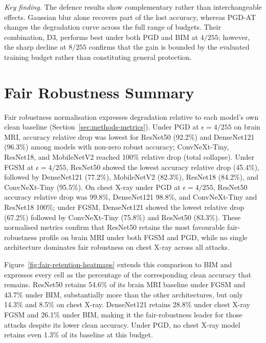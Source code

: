 \documentclass[12pt,a4paper,oneside]{report}
\begin{document}
\noindent\textit{Key finding.} The defence results show complementary rather than interchangeable effects. Gaussian blur alone recovers part of the lost accuracy, whereas PGD-AT changes the degradation curve across the full range of budgets. Their combination, D3, performs best under both PGD and BIM at $4/255$; however, the sharp decline at $8/255$ confirms that the gain is bounded by the evaluated training budget rather than constituting general protection.

\section{Fair Robustness Summary}
\label{sec:results-fair}


Fair robustness normalisation expresses degradation relative to each model's own clean baseline (Section~\ref{sec:methods-metrics}). Under PGD at $\epsilon = 4/255$ on brain MRI, accuracy relative drop was lowest for ResNet50 (92.2\%) and DenseNet121 (96.3\%) among models with non-zero robust accuracy; ConvNeXt-Tiny, ResNet18, and MobileNetV2 reached 100\% relative drop (total collapse). Under FGSM at $\epsilon = 4/255$, ResNet50 showed the lowest accuracy relative drop (45.4\%), followed by DenseNet121 (77.2\%), MobileNetV2 (82.3\%), ResNet18 (84.2\%), and ConvNeXt-Tiny (95.5\%). On chest X-ray under PGD at $\epsilon = 4/255$, ResNet50 accuracy relative drop was 99.8\%, DenseNet121 98.8\%, and ConvNeXt-Tiny and ResNet18 100\%; under FGSM, DenseNet121 showed the lowest relative drop (67.2\%) followed by ConvNeXt-Tiny (75.8\%) and ResNet50 (83.3\%). These normalised metrics confirm that ResNet50 retains the most favourable fair-robustness profile on brain MRI under both FGSM and PGD, while no single architecture dominates fair robustness on chest X-ray across all attacks.

Figure~\ref{fig:fair-retention-heatmaps} extends this comparison to BIM and expresses every cell as the percentage of the corresponding clean accuracy that remains. ResNet50 retains 54.6\% of its brain MRI baseline under FGSM and 43.7\% under BIM, substantially more than the other architectures, but only 14.3\% and 8.5\% on chest X-ray. DenseNet121 retains 28.8\% under chest X-ray FGSM and 26.1\% under BIM, making it the fair-robustness leader for those attacks despite its lower clean accuracy. Under PGD, no chest X-ray model retains even 1.3\% of its baseline at this budget.
\end{document}
